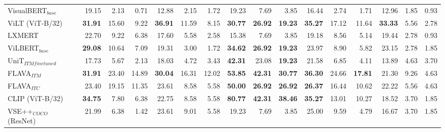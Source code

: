 \begin{table}[ht]
\begin{adjustbox}{max width=\textwidth}
\begin{tabular}{l|rrr|rrr|rrr|rrr|rrr}
 VisualBERT$_{base}$          & 19.15          & 2.13           & 0.71           & 12.88          & 2.15           & 1.72           & 19.23          & 7.69           & 3.85           & 16.44          & 2.74           & 1.71           & 12.96          & 1.85           & 0.93           \\
 ViLT (ViT-B/32)              & \textbf{31.91} & 15.60          & 9.22           & \textbf{36.91} & 11.59          & 8.15           & \textbf{30.77} & \textbf{26.92} & \textbf{19.23} & \textbf{35.27} & 17.12          & 11.64          & \textbf{33.33} & 5.56           & 2.78           \\
 LXMERT                       & 22.70          & 9.22           & 6.38           & 17.60          & 5.58           & 2.58           & 15.38          & 7.69           & 3.85           & 19.18          & 8.56           & 5.14           & 19.44          & 2.78           & 0.93           \\
 ViLBERT$_{base}$             & \textbf{29.08} & 10.64          & 7.09           & 19.31          & 3.00           & 1.72           & \textbf{34.62} & \textbf{26.92} & \textbf{19.23} & 23.97          & 8.90           & 5.82           & 23.15          & 2.78           & 1.85           \\
 UniT$_{ITM finetuned}$       & 17.73          & 5.67           & 2.13           & 18.03          & 4.72           & 3.43           & \textbf{42.31} & 23.08          & \textbf{19.23} & 21.58          & 6.85           & 4.11           & 13.89          & 4.63           & 3.70           \\
  FLAVA$_{ITM}$                & \textbf{31.91} & 23.40 & 14.89 & \textbf{30.04} & 16.31 & 12.02 & \textbf{53.85} & \textbf{42.31} & \textbf{30.77} & \textbf{36.30} & 24.66 & \textbf{17.81} & 21.30          & 9.26 & 4.63 \\
 FLAVA$_{ITC}$        & 23.40          & 19.15 & 11.35 & 23.61          &  8.58 &  5.58 & \textbf{50.00} & \textbf{26.92} & \textbf{26.92} & \textbf{26.37} & 16.44 & 10.62          & 22.22          &  5.56 & 4.63 \\
 CLIP (ViT-B/32)              & \textbf{34.75} & 7.80           & 6.38           & 22.75          & 8.58           & 5.58           & \textbf{80.77} & \textbf{42.31} & \textbf{38.46} & \textbf{35.27} & 13.01          & 10.27          & 18.52          & 3.70           & 1.85           \\
 VSE++$_{COCO}$ (ResNet)      & 21.99          & 6.38           & 1.42           & 23.61          & 9.01           & 5.58           & 19.23          & 7.69           & 3.85           & 25.00          & 9.59           & 4.79           & 16.67          & 3.70           & 1.85           \\

\end{tabular}
\end{adjustbox}
\end{table}
